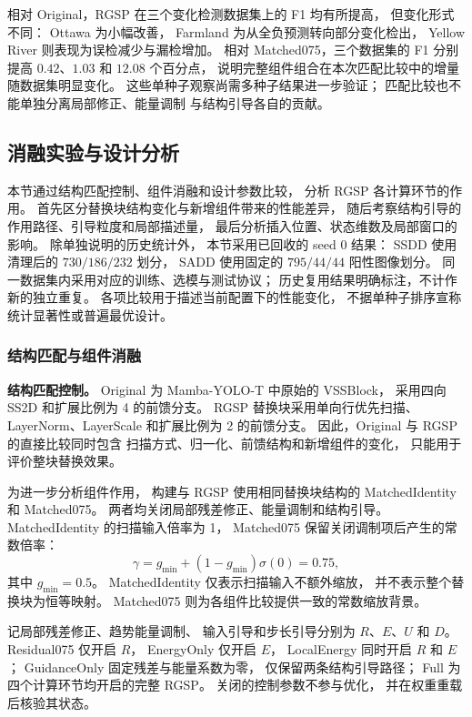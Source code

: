 \documentclass[journal]{IEEEtran}
\begin{document}
相对 Original，RGSP 在三个变化检测数据集上的 F1 均有所提高，
但变化形式不同：
Ottawa 为小幅改善，
Farmland 为从全负预测转向部分变化检出，
Yellow River 则表现为误检减少与漏检增加。
相对 Matched075，三个数据集的 F1
分别提高 $0.42$、$1.03$ 和 $12.08$ 个百分点，
说明完整组件组合在本次匹配比较中的增量
随数据集明显变化。
这些单种子观察尚需多种子结果进一步验证；
匹配比较也不能单独分离局部修正、能量调制
与结构引导各自的贡献。

\FloatBarrier
\subsection{消融实验与设计分析}
\label{sec:ablation_analysis}

本节通过结构匹配控制、组件消融和设计参数比较，
分析 RGSP 各计算环节的作用。
首先区分替换块结构变化与新增组件带来的性能差异，
随后考察结构引导的作用路径、引导粒度和局部描述量，
最后分析插入位置、状态维数及局部窗口的影响。
除单独说明的历史统计外，
本节采用已回收的 seed 0 结果：
SSDD 使用清理后的 $730/186/232$ 划分，
SADD 使用固定的 $795/44/44$ 阳性图像划分。
同一数据集内采用对应的训练、选模与测试协议；
历史复用结果明确标注，不计作新的独立重复。
各项比较用于描述当前配置下的性能变化，
不据单种子排序宣称统计显著性或普遍最优设计。

\subsubsection{结构匹配与组件消融}
\label{sec:matched_component_ablation}

\textbf{结构匹配控制。}
Original 为 Mamba-YOLO-T 中原始的 VSSBlock，
采用四向 SS2D 和扩展比例为 4 的前馈分支。
RGSP 替换块采用单向行优先扫描、
LayerNorm、LayerScale 和扩展比例为 2 的前馈分支。
因此，Original 与 RGSP 的直接比较同时包含
扫描方式、归一化、前馈结构和新增组件的变化，
只能用于评价整块替换效果。

为进一步分析组件作用，
构建与 RGSP 使用相同替换块结构的
MatchedIdentity 和 Matched075。
两者均关闭局部残差修正、能量调制和结构引导。
MatchedIdentity 的扫描输入倍率为 1，
Matched075 保留关闭调制项后产生的常数倍率：
\begin{equation}
\gamma
=g_{\min}+(1-g_{\min})\sigma(0)
=0.75,
\label{eq:ablation_matched_scale}
\end{equation}
其中 $g_{\min}=0.5$。
MatchedIdentity 仅表示扫描输入不额外缩放，
并不表示整个替换块为恒等映射。
Matched075 则为各组件比较提供一致的常数缩放背景。

记局部残差修正、趋势能量调制、
输入引导和步长引导分别为
$R$、$E$、$U$ 和 $D$。
Residual075 仅开启 $R$，
EnergyOnly 仅开启 $E$，
LocalEnergy 同时开启 $R$ 和 $E$；
GuidanceOnly 固定残差与能量系数为零，
仅保留两条结构引导路径；
Full 为四个计算环节均开启的完整 RGSP。
关闭的控制参数不参与优化，
并在权重重载后核验其状态。
\end{document}
